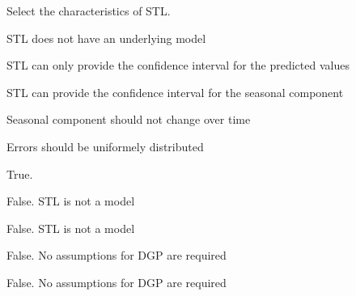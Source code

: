 
\begin{question}
Select the characteristics of STL.
\begin{answerlist}
  \item STL does not have an underlying model
  \item STL can only provide the confidence interval for the predicted values
  \item STL can provide the confidence interval for the seasonal component
  \item Seasonal component should not change over time
  \item Errors should be uniformely distributed
\end{answerlist}
\end{question}

\begin{solution}
\begin{answerlist}
  \item True.
  \item False. STL is not a model
  \item False. STL is not a model
  \item False. No assumptions for DGP are required
  \item False. No assumptions for DGP are required
\end{answerlist}
\end{solution}

